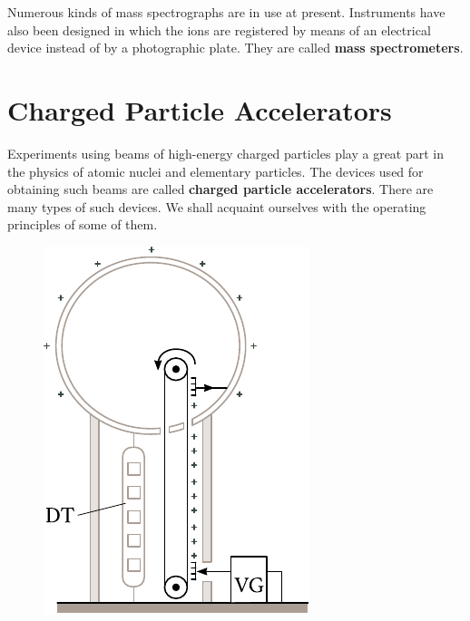 Numerous kinds of mass spectrographs are in use at present.
Instruments have also been designed in which the ions are registered by means of an electrical device instead of by a photographic plate.
They are called \textbf{mass spectrometers}.

\section{Charged Particle Accelerators}\label{sec:10_5}

Experiments using beams of high-energy charged particles play a great part in the physics of atomic nuclei and elementary particles.
The devices used for obtaining such beams are called \textbf{charged particle accelerators}.
There are many types of such devices.
We shall acquaint ourselves with the operating principles of some of them.

\begin{figure}[t]
	\begin{center}
		\includegraphics[scale=1]{figures/ch_10/fig_10_14.pdf}
		\caption[]{}
		\label{fig:10_14}
	\end{center}
	\vspace{-0.8cm}
\end{figure}

